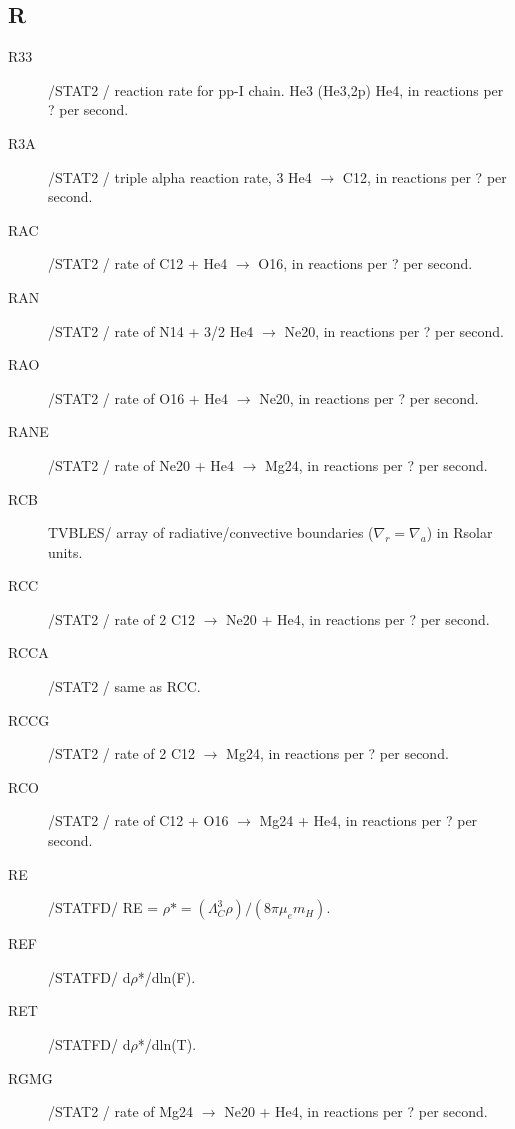 \documentclass{article}
\begin{document}
\subsection*{R}
\begin{description}
	\item[R33]		    /STAT2 / reaction rate for pp-I chain.  He3 (He3,2p) He4, in reactions per ? per second.

	\item[R3A]		    /STAT2 / triple alpha reaction rate, 3 He4 $\to$ C12, in reactions per ? per second.

	\item[RAC]		    /STAT2 / rate of C12 + He4 $\to$ O16, in reactions per ? per second.

	\item[RAN]		    /STAT2 / rate of N14 + 3/2 He4 $\to$ Ne20, in reactions per ? per second.

	\item[RAO]		    /STAT2 / rate of O16 + He4 $\to$ Ne20, in reactions per ? per second.

	\item[RANE]		/STAT2 / rate of Ne20 + He4 $\to$ Mg24, in reactions per ? per second.

	\item[RCB]		    TVBLES/ array of radiative/convective boundaries ($\nabla_r=\nabla_a$) in Rsolar units.

	\item[RCC]		    /STAT2 / rate of 2 C12 $\to$ Ne20 + He4, in reactions per ? per second.

	\item[RCCA]		/STAT2 / same as RCC.

	\item[RCCG]		/STAT2 / rate of 2 C12 $\to$ Mg24, in reactions per ? per second.

	\item[RCO]		    /STAT2 / rate of C12 + O16 $\to$ Mg24 + He4, in reactions per ? per second.

	\item[RE]     	/STATFD/ RE = $\rho* = (\Lambda_C^3 \rho)/(8 \pi \mu_e m_H)$.

	\item[REF]     	/STATFD/ d$\rho$*/dln(F).

	\item[RET]     	/STATFD/ d$\rho$*/dln(T).

	\item[RGMG]		/STAT2 / rate of Mg24 $\to$ Ne20 + He4, in reactions per ? per second.


\end{description}
\end{document}
